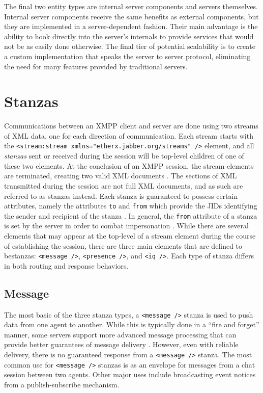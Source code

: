 The final two entity types are internal server components and servers themselves.
Internal server components receive the same benefits as external components, but
they are implemented in a server-dependent fashion. Their main advantage is the
ability to hook directly into the server's internals to provide services that
would not be as easily done otherwise. The final tier of potential scalability
is to create a custom implementation that speaks the server to server protocol,
eliminating the need for many features provided by traditional servers.

\section{Stanzas}
\label{sec:Stanzas}

Communications between an XMPP client and server are done using two streams of
XML data, one for each direction of communication. Each stream starts with the
\texttt{<stream:stream xmlns="etherx.jabber.org/streams" />} element, and all
\textit{stanzas} sent or received during the session will be top-level children
of one of these two elements. At the conclusion of an XMPP session, the stream
elements are terminated, creating two valid XML documents \cite{RFC3920}. The
sections of XML transmitted during the session are not full XML documents,
and as such are referred to as stanzas instead. Each stanza is guaranteed to
possess certain attributes, namely the attributes \texttt{to} and \texttt{from}
which provide the JIDs identifying the sender and recipient of the stanza
\cite{RFC3920}. In general, the \texttt{from} attribute of a stanza is set by
the server in order to combat impersonation \cite{XMPP-Server-From}. While
there are several elements that may appear at the top-level of a stream element
during the course of establishing the session, there are three main elements
that are defined to bestanzas: \texttt{<message />}, \texttt{<presence />},
and \texttt{<iq />}. Each type of stanza differs in both routing and response
behaviors.

\subsection{Message}
\label{sec:Message}

The most basic of the three stanza types, a \texttt{<message />} stanza is used
to push data from one agent to another. While this is typically done in a ``fire
and forget'' manner, some servers support more advanced message processing that
can provide better guarantees of message delivery \cite{XMPP-AMP}. However, even
with reliable delivery, there is no guaranteed response from a \texttt{<message
/>} stanza. The most common use for \texttt{<message />} stanzas is as an
envelope for messages from a chat session between two agents. Other major uses
include broadcasting event notices from a publish-subscribe mechanism.

